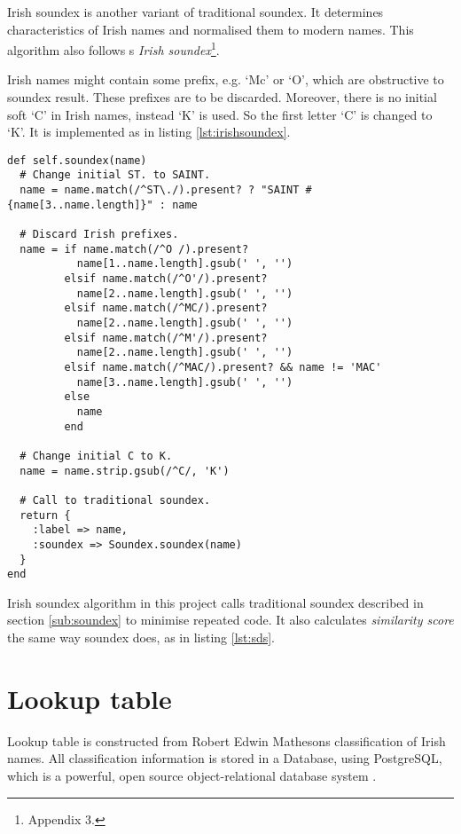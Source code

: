 Irish soundex is another variant of traditional soundex. It determines
characteristics of Irish names and normalised them to modern names.
This algorithm also follows \citeauthor{adamw}\textquotesingle s
\emph{Irish soundex}\footnote{\cite{adamw} Appendix 3.}.

Irish names might contain some prefix, e.g. `Mc' or `O',
which are obstructive to soundex result. These prefixes are to be
discarded. Moreover, there is no initial soft `C' in Irish names,
instead `K' is used. So the first letter `C' is changed to `K'.
It is implemented as in listing \ref{lst:irishsoundex}.

\begin{minipage}{\linewidth}
\begin{lstlisting}[label={lst:irishsoundex}, caption={Irish soundex implementation.}]
def self.soundex(name)
  # Change initial ST. to SAINT.
  name = name.match(/^ST\./).present? ? "SAINT #{name[3..name.length]}" : name

  # Discard Irish prefixes.
  name = if name.match(/^O /).present?
           name[1..name.length].gsub(' ', '')
         elsif name.match(/^O'/).present?
           name[2..name.length].gsub(' ', '')
         elsif name.match(/^MC/).present?
           name[2..name.length].gsub(' ', '')
         elsif name.match(/^M'/).present?
           name[2..name.length].gsub(' ', '')
         elsif name.match(/^MAC/).present? && name != 'MAC'
           name[3..name.length].gsub(' ', '')
         else
           name
         end

  # Change initial C to K.
  name = name.strip.gsub(/^C/, 'K')

  # Call to traditional soundex.
  return {
    :label => name,
    :soundex => Soundex.soundex(name)
  }
end
\end{lstlisting}
\end{minipage}

Irish soundex algorithm in this project calls traditional soundex
described in section \ref{sub:soundex} to minimise repeated code.
It also calculates \emph{similarity score} the same way
soundex does, as in listing \ref{lst:sds}.

\section{Lookup table}
\label{sec:lookuptable}

Lookup table is constructed from Robert Edwin Matheson\textquotesingle s
classification of Irish names. All classification information
is stored in a Database, using PostgreSQL, which is a powerful,
open source object-relational database system \cite[]{postgresql}.


